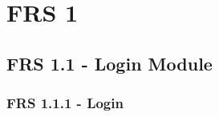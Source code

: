 \newpage

\section{FRS 1}

\subsection{FRS 1.1 - Login Module}

\subsubsection*{FRS 1.1.1 - Login}

